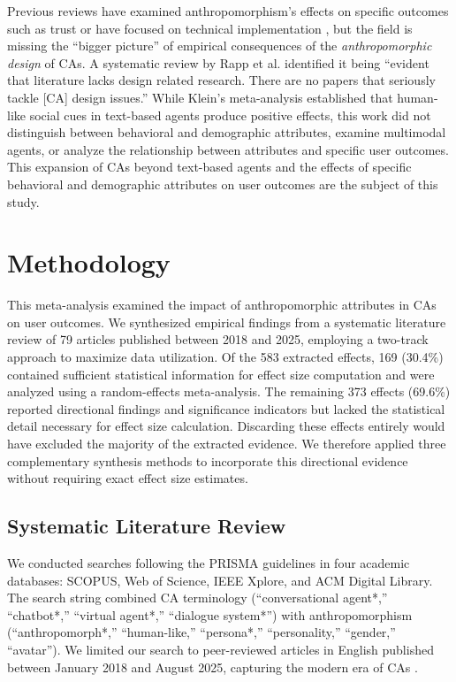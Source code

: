 \documentclass[manuscript,screen,review,anonymous]{acmart}
\DeclareRobustCommand{\change}[1]{%
    \textcolor{changeblue}{#1}%
  }
\DeclareRobustCommand{\change}[1]{#1}
\begin{document}
Previous reviews have examined anthropomorphism's effects on specific outcomes such as trust \citep{bach2024systematic} or have focused on technical implementation \cite{chen2024trends}, but the field is missing the ``bigger picture'' of empirical consequences of the \textit{anthropomorphic design} of CAs. A systematic review by Rapp et al. \cite{rapp_human_2021} identified it being ``evident that literature lacks design related research. There are no papers that seriously tackle [CA] design issues.'' While Klein's \cite{klein_effects_2025} meta-analysis established that human-like social cues in text-based agents produce positive effects, this work did not distinguish between behavioral and demographic attributes, examine multimodal agents, or analyze the relationship between attributes and specific user outcomes. This expansion of CAs beyond text-based agents and the effects of specific behavioral and demographic attributes on user outcomes are the subject of this study. 

\section{Methodology}
This meta-analysis examined the impact of anthropomorphic attributes in CAs on user outcomes. We synthesized empirical findings from a systematic literature review \cite{amin2025anthropomorphism} of 79 articles published between 2018 and 2025, employing a two-track approach to maximize data utilization. \change{Of the 583 extracted effects, 169 (30.4\%) contained sufficient statistical information for effect size computation and were analyzed using a random-effects meta-analysis. The remaining 373 effects (69.6\%) reported directional findings and significance indicators but lacked the statistical detail necessary for effect size calculation. Discarding these effects entirely would have excluded the majority of the extracted evidence. We therefore applied three complementary synthesis methods to incorporate this directional evidence without requiring exact effect size estimates.}

\subsection{Systematic Literature Review}

We conducted searches following the PRISMA guidelines \cite{page_prisma_2021} in four academic databases: SCOPUS, Web of Science, IEEE Xplore, and ACM Digital Library. The search string combined CA terminology (``conversational agent*,'' ``chatbot*,'' ``virtual agent*,'' ``dialogue system*'') with anthropomorphism (``anthropomorph*,'' ``human-like,'' ``persona*,'' ``personality,'' ``gender,'' ``avatar''). We limited our search to peer-reviewed articles in English published between January 2018 and August 2025, capturing the modern era of CAs \cite{zhang2018personalizing}. %
\end{document}
